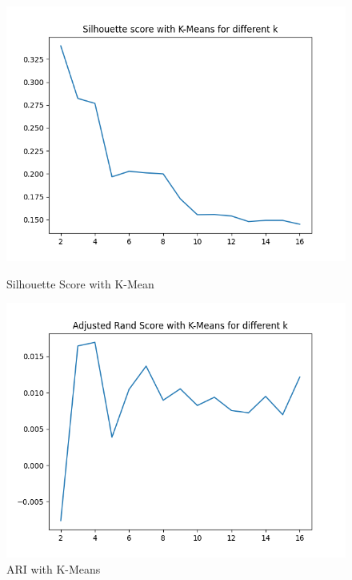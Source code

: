\begin{figure}
	\begin{minipage}[b]{0.37\paperwidth}
	\centerline{\includegraphics[width=\textwidth]{Imagenes/Bitmap/Clustering/normkmeanssil.png}}%
	\caption{Silhouette Score with K-Mean}%
	\label{fig:nkmeanssil}
	\end{minipage}
	\begin{minipage}[b]{0.37\paperwidth}
		\centerline{\includegraphics[width=\textwidth]{Imagenes/Bitmap/Clustering/normkmeansrand.png}}%
		\caption{ARI with K-Means}%
		\label{fig:nkmeansari}
	\end{minipage}
\end{figure}

